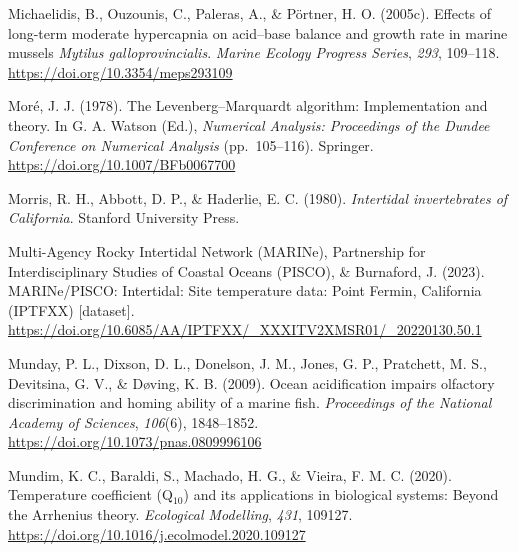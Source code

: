 \documentclass{CSUNthesis}
\begin{document}
\vspace{0.1em}

Michaelidis, B., Ouzounis, C., Paleras, A., \& Pörtner, H. O. (2005c). Effects of long-term moderate hypercapnia on acid--base balance and growth rate in marine mussels \textit{Mytilus galloprovincialis}. \textit{Marine Ecology Progress Series}, \textit{293}, 109--118. \url{https://doi.org/10.3354/meps293109}

\vspace{0.1em}

\vspace{0.1em}

Moré, J. J. (1978). The Levenberg--Marquardt algorithm: Implementation and theory. In G. A. Watson (Ed.), \textit{Numerical Analysis: Proceedings of the Dundee Conference on Numerical Analysis} (pp.~105--116). Springer. \url{https://doi.org/10.1007/BFb0067700}

\vspace{0.1em}

Morris, R. H., Abbott, D. P., \& Haderlie, E. C. (1980). \textit{Intertidal invertebrates of California}. Stanford University Press.

\vspace{0.1em}

Multi-Agency Rocky Intertidal Network (MARINe), Partnership for Interdisciplinary Studies of Coastal Oceans (PISCO), \& Burnaford, J. (2023). MARINe/PISCO: Intertidal: Site temperature data: Point Fermin, California (IPTFXX) {[}dataset{]}. \url{https://doi.org/10.6085/AA/IPTFXX/_XXXITV2XMSR01/_20220130.50.1}

\vspace{0.1em}

Munday, P. L., Dixson, D. L., Donelson, J. M., Jones, G. P., Pratchett, M. S., Devitsina, G. V., \& Døving, K. B. (2009). Ocean acidification impairs olfactory discrimination and homing ability of a marine fish. \textit{Proceedings of the National Academy of Sciences}, \textit{106}(6), 1848--1852. \url{https://doi.org/10.1073/pnas.0809996106}

\vspace{0.1em}

Mundim, K. C., Baraldi, S., Machado, H. G., \& Vieira, F. M. C. (2020). Temperature coefficient (Q\(_{10}\)) and its applications in biological systems: Beyond the Arrhenius theory. \textit{Ecological Modelling}, \textit{431}, 109127. \url{https://doi.org/10.1016/j.ecolmodel.2020.109127}

\vspace{0.1em}
\end{document}
